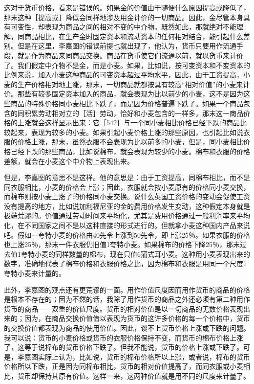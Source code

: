 这对于货币价格，看来是错误的。如果金的价值由于随便什么原因提高或降低了，那末这种［提高或］降低会同样地涉及用金计价的一切商品。因此，金尽管本身具有可变性，却表现为商品之间的相对不变的中介物。既然如此，那就绝对不能理解，同商品相比，在生产金时固定资本和流动资本的任何相对结合，能引起什么差别。但是在这里，李嘉图的错误前提也就出现了，他认为，货币只要用作流通手段，就是作为商品来同商品交换。商品在货币使它们流通以前，就以货币来计价了。我们假定中介物不是金，而是小麦。如果，比如说，按可变资本和不变资本的比例来说，加入小麦这种商品的可变资本超过平均水平，因此，由于工资提高，小麦的生产价格相对地上涨，那末，一切商品就都按具有较高“相对价值”的小麦来计价。那些有较多固定资本加入的商品，就会表现为比以前少的小麦，这不是因为这些商品的特殊价格同小麦相比下跌了，而是因为价格普遍下跌了。如果一个商品包含的同积累劳动相对立的［活］劳动，恰好和小麦包含的一样多，那末这一商品价格的上涨就会这样显示出来：它［542］与一个同小麦相比价格已经下跌的商品比较起来，表现为较多的小麦。如果引起小麦价格上涨的那些原因，也引起比如说衣服的价格上涨，那末，虽然衣服不会表现为比以前多的小麦，但是，同小麦相比价格已经下跌的那些商品，比如说棉布，就会表现为较少的小麦。棉布和衣服的价格差额，就会在小麦这个中介物上表现出来。

但是，李嘉图的意思不是这样。他的意思是：由于工资提高，同棉布相比，而不是同衣服相比，小麦的价格会上涨；因此，衣服就会按小麦原有的价格同小麦交换，而棉布则按小麦上涨了的价格同小麦交换。说什么英国工资价格的变动会促使工资没有提高的地方，比如说加利福尼亚的金的费用价格发生变动，这种假定本身就是极端荒谬的。价值通过劳动时间来平均化，尤其是费用价格通过一般利润率来平均化，在不同国家之间不是以这种直接的形式进行的。但就拿小麦这种国内产品来说吧。假如一夸特小麦的价格由40先令上涨到50先令，即上涨25％。如果衣服的价格也上涨25％，那末一件衣服仍旧值1夸特小麦。如果棉布的价格下降25％，那末过去值1夸特小麦的同样数量的棉布，现在只值6蒲式耳小麦。这种用小麦表现出来的数字，准确地代表了棉布价格和衣服价格之比，因为棉布和衣服是用同一个尺度1夸特小麦来计量的。

此外，李嘉图的观点还有更荒谬的一面。用作价值尺度因而用作货币的商品的价格是根本不存在的；因为不然的话，我除了用作货币的商品之外还必须有第二种用作货币的商品——双重的价值尺度。货币的相对价值是以一切商品的无数价格表现出来的；因为，在商品交换价值借以表现为货币的这许多价格的每一个价格中，货币的交换价值都表现为商品的使用价值。因此，谈不上货币价格上涨或下跌的问题。我可以说：货币的小麦价格或货币的衣服价格保持不变，而货币的棉布价格上涨了，这等于说棉布的货币价格下跌了。但我不能说，货币的价格上涨或下跌了。可是，李嘉图实际上认为，比如说，货币的棉布价格所以上涨，或者说，棉布的货币价格所以下跌，正是因为同棉布相比，货币的相对价值提高了，而同衣服或小麦相比，货币却保持其原有价值。这样一来，这两种价值就是用不同的尺度来计量了。

